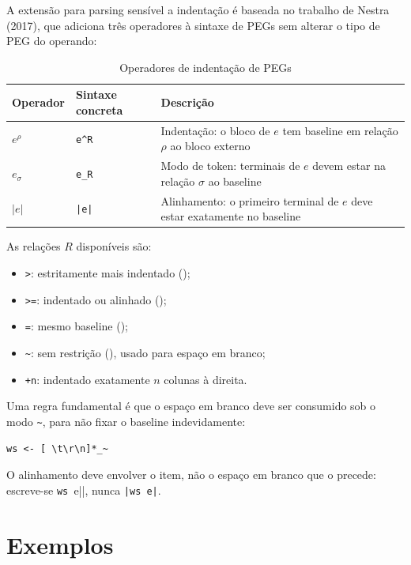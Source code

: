 A extensão para parsing sensível a indentação é baseada no trabalho de
Nestra (2017), que adiciona três operadores à sintaxe de PEGs sem
alterar o tipo de PEG do operando:

\begin{table}[ht]
  \centering
  \begin{tabular}{lll}
    \toprule
    Operador & Sintaxe concreta & Descrição \\
    \midrule
    $e^\rho$  & \verb|e^R|  & Indentação: o bloco de $e$ tem baseline
    em relação $\rho$ ao bloco externo \\
    $e_\sigma$ & \verb|e_R| & Modo de token: terminais de $e$ devem
    estar na relação $\sigma$ ao baseline \\
    $|e|$     & \verb-|e|-  & Alinhamento: o primeiro terminal de $e$
    deve estar exatamente no baseline \\
    \bottomrule
  \end{tabular}
  \caption{Operadores de indentação de PEGs}
\end{table}

As relações \(R\) disponíveis são:

\begin{itemize}
  \item \verb|>|: estritamente mais indentado ();
  \item \verb|>=|: indentado ou alinhado ();
  \item \verb|=|: mesmo baseline ();
  \item \verb|~|: sem restrição (), usado para espaço
    em branco;
  \item \verb|+n|: indentado exatamente \(n\) colunas à direita.
\end{itemize}

Uma regra fundamental é que o espaço em branco deve ser consumido
sob o modo \verb|~|, para não fixar o baseline indevidamente:

\begin{verbatim}
ws <- [ \t\r\n]*_~
\end{verbatim}

O alinhamento deve envolver o item, não o espaço em branco que o
precede: escreve-se \verb|ws |e||, nunca \verb-|ws e|-.

\section{Exemplos}

